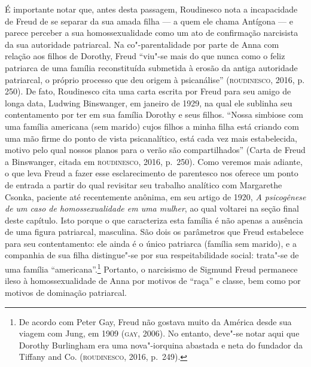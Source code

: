 É importante notar que, antes desta passagem, Roudinesco nota a
incapacidade de Freud de se separar da sua amada filha --- a quem ele
chama Antígona --- e parece perceber a sua homossexualidade como um ato
de confirmação narcisista da sua autoridade patriarcal. Na
co"-parentalidade por parte de Anna com relação aos filhos de Dorothy,
Freud ``viu"-se mais do que nunca como o feliz patriarca de uma família
reconstituída submetida à erosão da antiga autoridade patriarcal, o
próprio processo que deu origem à psicanálise'' (\textsc{roudinesco}, 2016, p.
250). De fato, Roudinesco cita uma carta escrita por Freud para seu amigo
de longa data, Ludwing Binswanger, em janeiro de 1929, na qual ele
sublinha seu contentamento por ter em sua família Dorothy e seus filhos.
``Nossa simbiose com uma família americana (sem marido) cujos filhos a
minha filha está criando com uma mão firme do ponto de vista
psicanalítico, está cada vez mais estabelecida, motivo pelo qual nossos
planos para o verão são compartilhados'' (Carta de Freud a Binswanger,
citada em \textsc{roudinesco}, 2016, p.~250). Como veremos mais adiante, o que leva
Freud a fazer esse esclarecimento de parentesco nos oferece um ponto de
entrada a partir do qual revisitar seu trabalho analítico com Margarethe
Csonka, paciente até recentemente anônima, em seu artigo de 1920,
\emph{A psicogênese de um caso de homossexualidade em uma mulher}, ao
qual voltarei na seção final deste capítulo. Isto porque o que
caracteriza esta família é não apenas a ausência de uma figura
patriarcal, masculina. São dois os parâmetros que Freud estabelece para
seu contentamento: ele ainda é o único patriarca (família sem marido), e
a companhia de sua filha distingue"-se por sua respeitabilidade social:
trata"-se de uma família ``americana''.\footnote{De acordo com Peter Gay,
  Freud não gostava muito da América desde sua viagem com Jung, em 1909
  (\textsc{gay}, 2006). No entanto, deve"-se notar aqui que Dorothy Burlingham era
  uma nova"-iorquina abastada e neta do fundador da Tiffany and Co.
  (\textsc{roudinesco}, 2016, p.~249).} Portanto, o narcisismo de Sigmund Freud
permanece ileso à homossexualidade de Anna por motivos de ``raça'' e
classe, bem como por motivos de dominação patriarcal.

